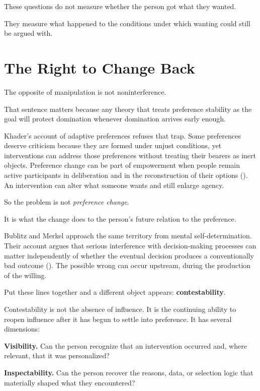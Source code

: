 \documentclass[
  10.5pt,
  letterpaper,
]{article}
\begin{document}
These questions do not measure whether the person got what they wanted.

They measure what happened to the conditions under which wanting could
still be argued with.

\section{The Right to Change Back}\label{the-right-to-change-back}

The opposite of manipulation is not noninterference.

That sentence matters because any theory that treats preference
stability as the goal will protect domination whenever domination
arrives early enough.

Khader's account of adaptive preferences refuses that trap. Some
preferences deserve criticism because they are formed under unjust
conditions, yet interventions can address those preferences without
treating their bearers as inert objects. Preference change can be part
of empowerment when people remain active participants in deliberation
and in the reconstruction of their options
(). An intervention can
alter what someone wants and still enlarge agency.

So the problem is not \emph{preference change}.

It is what the change does to the person's future relation to the
preference.

Bublitz and Merkel approach the same territory from mental
self-determination. Their account argues that serious interference with
decision-making processes can matter independently of whether the
eventual decision produces a conventionally bad outcome
(). The
possible wrong can occur upstream, during the production of the willing.

Put these lines together and a different object appears:
\textbf{contestability}.

Contestability is not the absence of influence. It is the continuing
ability to reopen influence after it has begun to settle into
preference. It has several dimensions:

\textbf{Visibility.} Can the person recognize that an intervention
occurred and, where relevant, that it was personalized?

\textbf{Inspectability.} Can the person recover the reasons, data, or
selection logic that materially shaped what they encountered?
\end{document}
